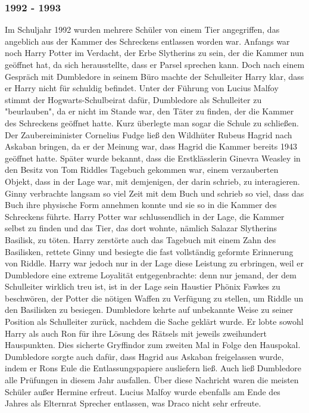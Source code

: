 \documentclass[a4paper, 10pt]{article}
\begin{document}
\subsubsection*{1992 - 1993}
Im Schuljahr 1992 wurden mehrere Schüler von einem Tier angegriffen, das angeblich aus der Kammer des Schreckens entlassen worden war. Anfangs war noch Harry Potter im Verdacht, der Erbe Slytherins zu sein, der die Kammer nun geöffnet hat, da sich herausstellte, dass er Parsel sprechen kann. Doch nach einem Gespräch mit Dumbledore in seinem Büro machte der Schulleiter Harry klar, dass er Harry nicht für schuldig befindet. Unter der Führung von Lucius Malfoy stimmt der Hogwarts-Schulbeirat dafür, Dumbledore als Schulleiter zu "beurlauben", da er nicht im Stande war, den Täter zu finden, der die Kammer des Schreckens geöffnet hatte. Kurz überlegte man sogar die Schule zu schließen. Der Zaubereiminister Cornelius Fudge ließ den Wildhüter Rubeus Hagrid nach Askaban bringen, da er der Meinung war, dass Hagrid die Kammer bereits 1943 geöffnet hatte.
\vspace{10pt}
\newline
Später wurde bekannt, dass die Erstklässlerin Ginevra Weasley in den Besitz von Tom Riddles Tagebuch gekommen war, einem verzauberten Objekt, dass in der Lage war, mit demjenigen, der darin schrieb, zu interagieren. Ginny verbrachte langsam so viel Zeit mit dem Buch und schrieb so viel, dass das Buch ihre physische Form annehmen konnte und sie so in die Kammer des Schreckens führte. Harry Potter war schlussendlich in der Lage, die Kammer selbst zu finden und das Tier, das dort wohnte, nämlich Salazar Slytherins Basilisk, zu töten. Harry zerstörte auch das Tagebuch mit einem Zahn des Basilisken, rettete Ginny und besiegte die fast vollständig geformte Erinnerung von Riddle. Harry war jedoch nur in der Lage diese Leistung zu erbringen, weil er Dumbledore eine extreme Loyalität entgegenbrachte: denn nur jemand, der dem Schulleiter wirklich treu ist, ist in der Lage sein Haustier Phönix Fawkes zu beschwören, der Potter die nötigen Waffen zu Verfügung zu stellen, um Riddle un den Basilisken zu besiegen.
\vspace{10pt}
\newline
Dumbledore kehrte auf unbekannte Weise zu seiner Position als Schulleiter zurück, nachdem die Sache geklärt wurde. Er lobte sowohl Harry als auch Ron für ihre Lösung des Rätsels mit jeweils zweihundert Hauspunkten. Dies sicherte Gryffindor zum zweiten Mal in Folge den Hauspokal. Dumbledore sorgte auch dafür, dass Hagrid aus Askaban freigelassen wurde, indem er Rons Eule die Entlassungspapiere ausliefern ließ. Auch ließ Dumbledore alle Prüfungen in diesem Jahr ausfallen. Über diese Nachricht waren die meisten Schüler außer Hermine erfreut. Lucius Malfoy wurde ebenfalls am Ende des Jahres als Elternrat Sprecher entlassen, was Draco nicht sehr erfreute.
\end{document}
